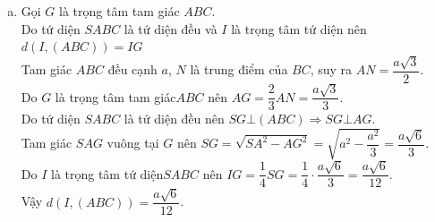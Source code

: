 \begin{ex}
{\begin{enumerate}[a)]
			      Suy ra $\vec{SB}+\vec{SC}+\vec{AB}+\vec{AC}=2\left(\vec{SN}+\vec{AN}\right)$\\
			      Do $M$ là trung điểm của $SA$ nên $\vec{NA}+\vec{NS}=2\vec{NM}\Leftrightarrow \vec{AN}+\vec{SN}=2\vec{MN}$.\\
			      Do đó $\vec{SB}+\vec{SC}+\vec{AB}+\vec{AC}=2 \cdot 2 \cdot \vec{MN}=4\vec{MN}$.
			\item Gọi $G$ là trọng tâm tam giác $ABC$.\\
			      Do tứ diện $SABC$ là tứ diện đều và $I$ là trọng tâm tứ diện nên $d\left(I,(ABC)\right)=IG$\\
			      Tam giác $ABC$ đều cạnh $a$, $N$ là trung điểm của $BC$, suy ra $AN=\dfrac{a\sqrt{3}}{2}$.\\
			      Do $G$ là trọng tâm tam giác$ABC$ nên $AG=\dfrac{2}{3}AN=\dfrac{a\sqrt{3}}{3}$.\\
			      Do tứ diện $SABC$ là tứ diện đều nên $SG\bot (ABC)\Rightarrow SG\bot AG$.\\
			      Tam giác $SAG$ vuông tại $G$ nên $SG=\sqrt{SA^2-AG^2}=\sqrt{a^2-\dfrac{a^2}{3}}=\dfrac{a\sqrt{6}}{3}$.\\
			      Do $I$ là trọng tâm tứ diện$SABC$ nên $IG=\dfrac{1}{4}SG=\dfrac{1}{4} \cdot \dfrac{a\sqrt{6}}{3}=\dfrac{a\sqrt{6}}{12}$.\\
			      Vậy $d\left(I,(ABC)\right)=\dfrac{a\sqrt{6}}{12}$.
		\end{enumerate}
	}
\end{ex}
